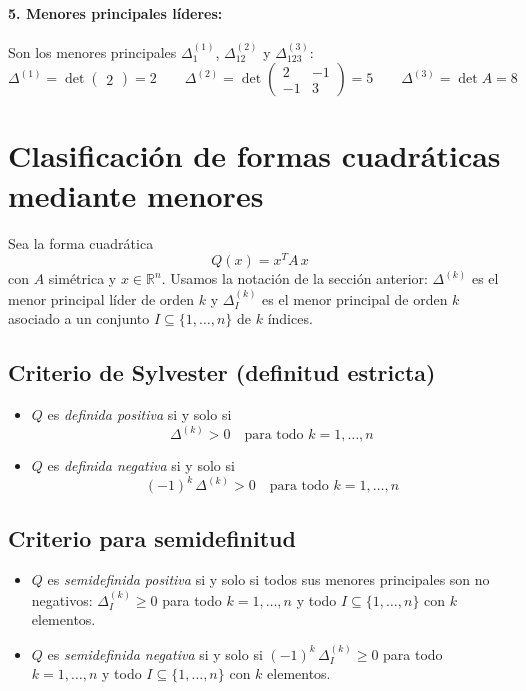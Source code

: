 \documentclass{article}
\begin{document}
\paragraph*{5. Menores principales líderes:}
Son los menores principales \(\Delta^{(1)}_1\), \(\Delta^{(2)}_{12}\) y \(\Delta^{(3)}_{123}\):
\[
\Delta^{(1)}=\det\begin{pmatrix}2\end{pmatrix}=2\qquad
\Delta^{(2)}=\det\begin{pmatrix}2&-1\\-1&3\end{pmatrix}=5\qquad
\Delta^{(3)}=\det A=8
\]


\section*{Clasificación de formas cuadráticas mediante menores}

Sea la forma cuadrática
\[
Q(x)=x^TA\,x
\]
con \(A\) simétrica y \(x\in\mathbb{R}^n\). Usamos la notación de la sección anterior: \(\Delta^{(k)}\) es el menor principal líder de orden \(k\) y \(\Delta^{(k)}_I\) es el menor principal de orden \(k\) asociado a un conjunto \(I\subseteq\{1,\dots,n\}\) de \(k\) índices.


\subsection*{Criterio de Sylvester (definitud estricta)}
\begin{itemize}\color{teal}
  \item \(Q\) es \emph{definida positiva} si y solo si
  \[
    \Delta^{(k)}>0\quad\text{para todo }k=1,\dots,n
  \]
  \item \(Q\) es \emph{definida negativa} si y solo si
  \[
    (-1)^k\,\Delta^{(k)}>0\quad\text{para todo }k=1,\dots,n
  \]
\end{itemize}

\subsection*{Criterio para semidefinitud}
\begin{itemize}\color{teal}
  \item \(Q\) es \emph{semidefinida positiva} si y solo si todos sus menores principales son no negativos: \(\Delta^{(k)}_I\ge0\) para todo \(k=1,\dots,n\) y todo \(I\subseteq\{1,\dots,n\}\) con \(k\) elementos.
  \item \(Q\) es \emph{semidefinida negativa} si y solo si \((-1)^k\,\Delta^{(k)}_I\ge0\) para todo \(k=1,\dots,n\) y todo \(I\subseteq\{1,\dots,n\}\) con \(k\) elementos.
\end{itemize}
\end{document}
